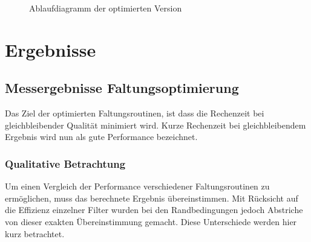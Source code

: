 \documentclass[a4paper,12pt]{article}
\begin{document}
 
\begin{figure}[htbp]
\caption{Ablaufdiagramm der optimierten Version}%
\label{figure_konverg_ablauf}
\end{figure}

\newpage
\section{Ergebnisse}
\subsection{Messergebnisse Faltungsoptimierung}\label{chp:mess_faltungen}

Das Ziel der optimierten Faltungsroutinen, ist dass die Rechenzeit bei
gleichbleibender Qualität minimiert wird. Kurze Rechenzeit bei
gleichbleibendem Ergebnis wird nun als gute Performance bezeichnet.

\subsubsection{Qualitative Betrachtung}
Um einen Vergleich der Performance verschiedener Faltungsroutinen zu
ermöglichen, muss das berechnete Ergebnis übereinstimmen.  
Mit Rücksicht auf die Effizienz einzelner Filter wurden bei den Randbedingungen
jedoch Abstriche von dieser exakten Übereinstimmung gemacht.
 Diese Unterschiede werden hier kurz betrachtet.
\end{document}
